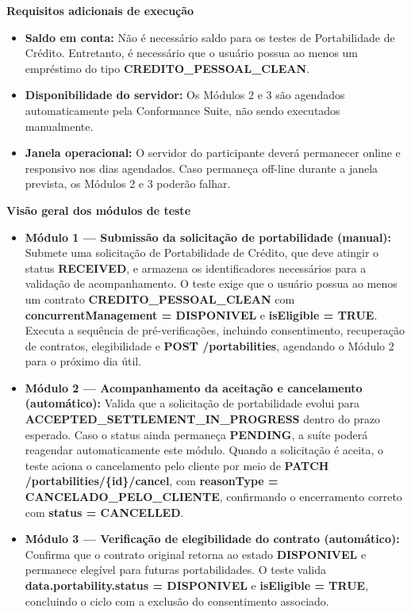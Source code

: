 \textbf{Requisitos adicionais de execução}

\begin{itemize}
    \item \textbf{Saldo em conta:} Não é necessário saldo para os testes de Portabilidade de Crédito. Entretanto, é necessário que o usuário possua ao menos um empréstimo do tipo \textbf{CREDITO\_PESSOAL\_CLEAN}.
    \item \textbf{Disponibilidade do servidor:} Os Módulos 2 e 3 são agendados automaticamente pela Conformance Suite, não sendo executados manualmente.
    \item \textbf{Janela operacional:} O servidor do participante deverá permanecer online e responsivo nos dias agendados. Caso permaneça off-line durante a janela prevista, os Módulos 2 e 3 poderão falhar.
\end{itemize}

\textbf{Visão geral dos módulos de teste}

\begin{itemize}
    \item \textbf{Módulo 1 — Submissão da solicitação de portabilidade (manual):} Submete uma solicitação de Portabilidade de Crédito, que deve atingir o status \textbf{RECEIVED}, e armazena os identificadores necessários para a validação de acompanhamento. O teste exige que o usuário possua ao menos um contrato \textbf{CREDITO\_PESSOAL\_CLEAN} com \textbf{concurrentManagement = DISPONIVEL} e \textbf{isEligible = TRUE}. Executa a sequência de pré-verificações, incluindo consentimento, recuperação de contratos, elegibilidade e \textbf{POST /portabilities}, agendando o Módulo 2 para o próximo dia útil.
    \item \textbf{Módulo 2 — Acompanhamento da aceitação e cancelamento (automático):} Valida que a solicitação de portabilidade evolui para\newline
    \textbf{ACCEPTED\_SETTLEMENT\_IN\_PROGRESS} dentro do prazo esperado. Caso o status ainda permaneça \textbf{PENDING}, a suíte poderá reagendar automaticamente este módulo. Quando a solicitação é aceita, o teste aciona o cancelamento pelo cliente por meio de \textbf{PATCH /portabilities/\{id\}/cancel}, com \textbf{reasonType = CANCELADO\_PELO\_CLIENTE}, confirmando o encerramento correto com \textbf{status = CANCELLED}.
    
    \item \textbf{Módulo 3 — Verificação de elegibilidade do contrato (automático):} Confirma que o contrato original retorna ao estado \textbf{DISPONIVEL} e permanece elegível para futuras portabilidades. O teste valida \textbf{data.portability.status = DISPONIVEL} e \textbf{isEligible = TRUE}, concluindo o ciclo com a exclusão do consentimento associado.
\end{itemize}

